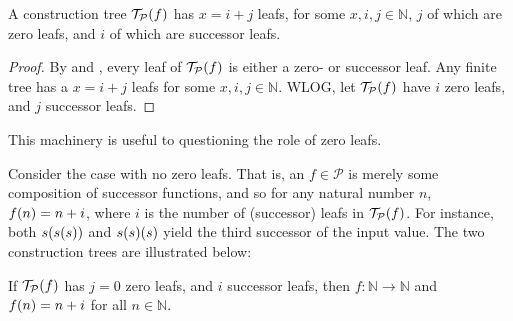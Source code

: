 \begin{lemma} \label{lem:p-tree-leafs} A construction tree
$\mathcal{T}_\mathcal{P}{\mathopen{}\left({f}\right)\mathclose{}}$ has $x=i+j$ leafs, for some $x,i,j \in
\mathbb{N}$, $j$ of which are zero leafs, and $i$ of which are successor leafs.
\end{lemma}

\begin{proof} By  and ,
every leaf of $\mathcal{T}_\mathcal{P}{\mathopen{}\left({f}\right)\mathclose{}}$ is either a zero- or successor
leaf. Any finite tree has a $x=i+j$ leafs for some $x,i,j \in \mathbb{N}$.
WLOG, let $\mathcal{T}_\mathcal{P}{\mathopen{}\left({f}\right)\mathclose{}}$ have $i$ zero leafs, and $j$ successor
leafs. \end{proof} 

This machinery is useful to questioning the role of zero leafs.

Consider the case with no zero leafs. That is, an $f \in \mathcal{P}$ is merely
some composition of successor functions, and so for any natural number $n$,
$f{\mathopen{}\left({n}\right)\mathclose{}}=n+i$, where $i$ is the number of (successor) leafs in
$\mathcal{T}_\mathcal{P}{\mathopen{}\left({f}\right)\mathclose{}}$. For instance, both $s{\mathopen{}\left({s{\mathopen{}\left({s}\right)\mathclose{}}}\right)\mathclose{}}$ and
$s{\mathopen{}\left({s}\right)\mathclose{}}{\mathopen{}\left({s}\right)\mathclose{}}$ yield the third successor of the input value. The two
construction trees are illustrated below:

\begin{center}
\begin{minipage}{0.4\textwidth}
\begin{center}
\end{center}
\end{minipage}
%
\begin{minipage}{0.4\textwidth}
\begin{center}
\end{center}
\end{minipage}
\end{center}

\begin{lemma} \label{lem:p-no-zero} If $\mathcal{T}_\mathcal{P}{\mathopen{}\left({f}\right)\mathclose{}}$ has $j=0$
zero leafs, and $i$ successor leafs, then $f : \mathbb{N} \rightarrow
\mathbb{N}$ and $f{\mathopen{}\left({n}\right)\mathclose{}} = n + i$ for all $n \in \mathbb{N}$. \end{lemma}

